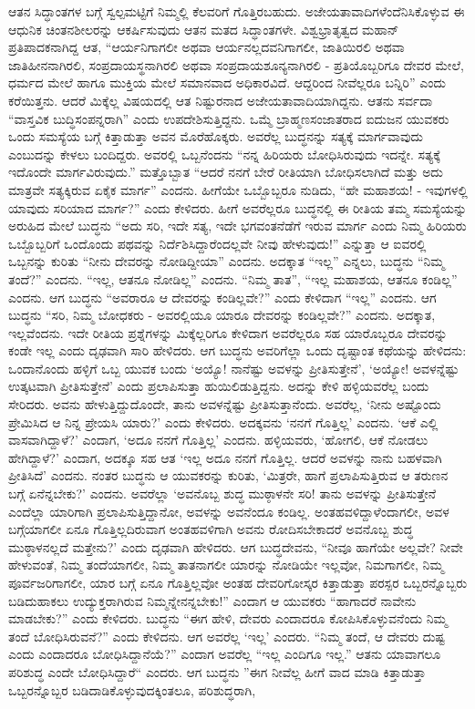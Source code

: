 ಆತನ ಸಿದ್ಧಾಂತಗಳ ಬಗ್ಗೆ ಸ್ವಲ್ಪಮಟ್ಟಿಗೆ ನಿಮ್ಮಲ್ಲಿ ಕೆಲವರಿಗೆ ಗೊತ್ತಿರಬಹುದು. ಅಜೇಯತಾವಾದಿಗಳೆಂದೆನಿಸಿಕೊಳ್ಳುವ ಈ ಆಧುನಿಕ ಚಿಂತನಶೀಲರನ್ನು ಆಕರ್ಷಿಸುವುದು ಆತನ ಮತದ ಸಿದ್ಧಾಂತಗಳೇ. ವಿಶ್ವಭ್ರಾತೃತ್ವದ ಮಹಾನ್ ಪ್ರತಿಪಾದಕನಾಗಿದ್ದ ಆತ, “ಆರ್ಯನಿಗಾಗಲೀ ಅಥವಾ ಆರ್ಯನಲ್ಲದವನಿಗಾಗಲೀ, ಜಾತಿಯಿರಲಿ ಅಥವಾ ಜಾತಿಹೀನನಾಗಿರಲಿ, ಸಂಪ್ರದಾಯಸ್ಥನಾಗಿರಲಿ ಅಥವಾ ಸಂಪ್ರದಾಯಶೂನ್ಯನಾಗಿರಲಿ - ಪ್ರತಿಯೊಬ್ಬರಿಗೂ ದೇವರ ಮೇಲೆ, ಧರ್ಮದ ಮೇಲೆ ಹಾಗೂ ಮುಕ್ತಿಯ ಮೇಲೆ ಸಮಾನವಾದ ಅಧಿಕಾರವಿದೆ. ಆದ್ದರಿಂದ ನೀವೆಲ್ಲರೂ ಬನ್ನಿರಿ” ಎಂದು ಕರೆಯಿತ್ತನು. ಆದರೆ ಮಿಕ್ಕೆಲ್ಲ ವಿಷಯದಲ್ಲಿ ಆತ ನಿಷ್ಟುರನಾದ ಅಜೇಯತಾವಾದಿಯಾಗಿದ್ದನು. ಆತನು ಸರ್ವದಾ “ವಾಸ್ತವಿಕ ಬುದ್ಧಿಸಂಪನ್ನರಾಗಿ” ಎಂದು ಉಪದೇಶಿಸುತ್ತಿದ್ದನು. ಒಮ್ಮೆ ಬ್ರಾಹ್ಮಣಸಂಜಾತರಾದ ಐದುಜನ ಯುವಕರು ಒಂದು ಸಮಸ್ಯೆಯ ಬಗ್ಗೆ ಕಿತ್ತಾಡುತ್ತಾ ಅವನ ಮೊರೆಹೊಕ್ಕರು. ಅವರೆಲ್ಲ ಬುದ್ಧನನ್ನು ಸತ್ಯಕ್ಕೆ ಮಾರ್ಗವಾವುದು ಎಂಬುದನ್ನು ಕೇಳಲು ಬಂದಿದ್ದರು. ಅವರಲ್ಲಿ ಒಬ್ಬನೆಂದನು “ನನ್ನ ಹಿರಿಯರು ಬೋಧಿಸಿರುವುದು ಇದನ್ನೇ. ಸತ್ಯಕ್ಕೆ ಇದೊಂದೇ ಮಾರ್ಗವಿರುವುದು.” ಮತ್ತೊಬ್ಬಾತ “ಆದರೆ ನನಗೆ ಬೇರೆ ರೀತಿಯಾಗಿ ಬೋಧಿಸಲಾಗಿದೆ ಮತ್ತು ಅದು ಮಾತ್ರವೇ ಸತ್ಯಕ್ಕಿರುವ ಏಕೈಕ ಮಾರ್ಗ” ಎಂದನು. ಹೀಗೆಯೇ ಒಬ್ಬೊಬ್ಬರೂ ನುಡಿದು, “ಹೇ ಮಹಾಶಯ! - ಇವುಗಳಲ್ಲಿ ಯಾವುದು ಸರಿಯಾದ ಮಾರ್ಗ?” ಎಂದು ಕೇಳಿದರು. ಹೀಗೆ ಅವರೆಲ್ಲರೂ ಬುದ್ಧನಲ್ಲಿ ಈ ರೀತಿಯ ತಮ್ಮ ಸಮಸ್ಯೆಯನ್ನು ಅರುಹಿದ ಮೇಲೆ ಬುದ್ಧನು “ಅದು ಸರಿ, ಇದೇ ಸತ್ಯ, ಇದೇ ಭಗವಂತನೆಡೆಗೆ ಇರುವ ಮಾರ್ಗ ಎಂದು ನಿಮ್ಮ ಹಿರಿಯರು ಒಬ್ಬೊಬ್ಬರಿಗೆ ಒಂದೊಂದು ಪಥವನ್ನು ನಿರ್ದೆಶಿಸಿದ್ದಾರೆಂದಲ್ಲವೇ ನೀವು ಹೇಳುವುದು!” ಎನ್ನುತ್ತಾ ಆ ಐವರಲ್ಲಿ ಒಬ್ಬನನ್ನು ಕುರಿತು “ನೀನು ದೇವರನ್ನು ನೋಡಿದ್ದೀಯಾ” ಎಂದನು. ಅದಕ್ಕಾತ “ಇಲ್ಲ” ಎನ್ನಲು, ಬುದ್ಧನು “ನಿಮ್ಮ ತಂದೆ?” ಎಂದನು. “ಇಲ್ಲ, ಆತನೂ ನೋಡಿಲ್ಲ” ಎಂದನು. “ನಿಮ್ಮ ತಾತ”, “ಇಲ್ಲ ಮಹಾಶಯ, ಆತನೂ ಕಂಡಿಲ್ಲ” ಎಂದನು. ಆಗ ಬುದ್ಧನು “ಅವರಾರೂ ಆ ದೇವರನ್ನು ಕಂಡಿಲ್ಲವೇ?” ಎಂದು ಕೇಳಿದಾಗ “ಇಲ್ಲ” ಎಂದನು. ಆಗ ಬುದ್ಧನು “ಸರಿ, ನಿಮ್ಮ ಬೋಧಕರು - ಅವರಲ್ಲಿಯೂ ಯಾರೂ ದೇವರನ್ನು ಕಂಡಿಲ್ಲವೇ?” ಎಂದನು. ಅದಕ್ಕಾತ, ಇಲ್ಲವೆಂದನು. ಇದೇ ರೀತಿಯ ಪ್ರಶ್ನೆಗಳನ್ನು ಮಿಕ್ಕೆಲ್ಲರಿಗೂ ಕೇಳಿದಾಗ ಅವರೆಲ್ಲರೂ ಸಹ ಯಾರೊಬ್ಬರೂ ದೇವರನ್ನು ಕಂಡೇ ಇಲ್ಲ ಎಂದು ದೃಢವಾಗಿ ಸಾರಿ ಹೇಳಿದರು. ಆಗ ಬುದ್ಧನು ಅವರಿಗೆಲ್ಲಾ ಒಂದು ದೃಷ್ಟಾಂತ ಕಥೆಯನ್ನು ಹೇಳಿದನು: ಒಂದಾನೊಂದು ಹಳ್ಳಿಗೆ ಒಬ್ಬ ಯುವಕ ಬಂದು ‘ಅಯ್ಯೊ! ನಾನೆಷ್ಟು ಅವಳನ್ನು ಪ್ರೀತಿಸುತ್ತೇನೆ’, ‘ಅಯ್ಯೋ! ಅವಳನ್ನೆಷ್ಟು ಉತ್ಕಟವಾಗಿ ಪ್ರೀತಿಸುತ್ತೇನೆ’ ಎಂದು ಪ್ರಲಾಪಿಸುತ್ತಾ ಹುಯಿಲಿಡುತ್ತಿದ್ದನು. ಅದನ್ನು ಕೇಳಿ ಹಳ್ಳಿಯವರೆಲ್ಲ ಬಂದು ಸೇರಿದರು. ಅವನು ಹೇಳುತ್ತಿದ್ದುದೊಂದೇ, ತಾನು ಅವಳನ್ನೆಷ್ಟು ಪ್ರೀತಿಸುತ್ತಾನೆಂದು. ಅವರೆಲ್ಲ, ‘ನೀನು ಅಷ್ಟೊಂದು ಪ್ರೇಮಿಸಿದ ಆ ನಿನ್ನ ಪ್ರೇಯಸಿ ಯಾರು?’ ಎಂದು ಕೇಳಿದರು. ಅದಕ್ಕವನು ‘ನನಗೆ ಗೊತ್ತಿಲ್ಲ’ ಎಂದನು. ‘ಆಕೆ ಎಲ್ಲಿ ವಾಸವಾಗಿದ್ದಾಳೆ?’ ಎಂದಾಗ, ‘ಅದೂ ನನಗೆ ಗೊತ್ತಿಲ್ಲ’ ಎಂದನು. ಹಳ್ಳಿಯವರು, ‘ಹೋಗಲಿ, ಆಕೆ ನೋಡಲು ಹೇಗಿದ್ದಾಳೆ?’ ಎಂದಾಗ, ಅದಕ್ಕೂ ಸಹ ಆತ ‘ಇಲ್ಲ ಅದೂ ನನಗೆ ಗೊತ್ತಿಲ್ಲ. ಆದರೆ ಅವಳನ್ನು ನಾನು ಬಹಳವಾಗಿ ಪ್ರೀತಿಸಿದೆ’ ಎಂದನು. ನಂತರ ಬುದ್ಧನು ಆ ಯುವಕರನ್ನು ಕುರಿತು, ‘ಮಿತ್ರರೇ, ಹಾಗೆ ಪ್ರಲಾಪಿಸುತ್ತಿರುವ ಆ ತರುಣನ ಬಗ್ಗೆ ಏನೆನ್ನಬೇಕು?’ ಎಂದನು. ಅವರೆಲ್ಲಾ ‘ಅವನೊಬ್ಬ ಶುದ್ಧ ಮುಠ್ಠಾಳನೇ ಸರಿ! ತಾನು ಅವಳನ್ನು ಪ್ರೀತಿಸುತ್ತೇನೆ ಎಂದೆಲ್ಲಾ ಯಾರಿಗಾಗಿ ಪ್ರಲಾಪಿಸುತ್ತಿದ್ದಾನೋ, ಅವಳನ್ನು ಅವನೆಂದೂ ಕಂಡಿಲ್ಲ. ಅಂತಹವಳಿದ್ದಾಳೆಂದಾಗಲೀ, ಅವಳ ಬಗ್ಗೆಯಾಗಲೀ ಏನೂ ಗೊತ್ತಿಲ್ಲದಿರುವಾಗ ಅಂತಹವಳಿಗಾಗಿ ಅವನು ರೋದಿಸಬೇಕಾದರೆ ಅವನೊಬ್ಬ ಶುದ್ಧ ಮುಠ್ಠಾಳನಲ್ಲದೆ ಮತ್ತೇನು?’ ಎಂದು ದೃಢವಾಗಿ ಹೇಳಿದರು. ಆಗ ಬುದ್ಧದೇವನು, “ನೀವೂ ಹಾಗೆಯೇ ಅಲ್ಲವೇ? ನೀವೇ ಹೇಳುವಂತೆ, ನಿಮ್ಮ ತಂದೆಯಾಗಲೀ, ನಿಮ್ಮ ತಾತನಾಗಲೀ ಯಾರನ್ನು ನೋಡಿಯೇ ಇಲ್ಲವೋ, ನಿಮಗಾಗಲೀ, ನಿಮ್ಮ ಪೂರ್ವಜರಿಗಾಗಲೀ, ಯಾರ ಬಗ್ಗೆ ಏನೂ ಗೊತ್ತಿಲ್ಲವೋ ಅಂತಹ ದೇವರಿಗೋಸ್ಕರ ಕಿತ್ತಾಡುತ್ತಾ ಪರಸ್ಪರ ಒಬ್ಬರನ್ನೊಬ್ಬರು ಬಡಿದುಹಾಕಲು ಉದ್ಯುಕ್ತರಾಗಿರುವ ನಿಮ್ಮನ್ನೇನನ್ನಬೇಕು!” ಎಂದಾಗ ಆ ಯುವಕರು “ಹಾಗಾದರೆ ನಾವೇನು ಮಾಡಬೇಕು?” ಎಂದು ಕೇಳಿದರು. ಬುದ್ಧನು “ಈಗ ಹೇಳಿ, ದೇವರು ಎಂದಾದರೂ ಕೋಪಿಸಿಕೊಳ್ಳುವನೆಂದು ನಿಮ್ಮ ತಂದೆ ಬೋಧಿಸಿರುವನೆ?” ಎಂದು ಕೇಳಿದನು. ಆಗ ಅವರೆಲ್ಲ ‘ಇಲ್ಲ’ ಎಂದರು. “ನಿಮ್ಮ ತಂದೆ, ಆ ದೇವರು ದುಷ್ಟ ಎಂದು ಎಂದಾದರೂ ಬೋಧಿಸಿದ್ದಾನೆಯೆ?” ಎಂದಾಗ ಅವರೆಲ್ಲ “ಇಲ್ಲ ಎಂದಿಗೂ ಇಲ್ಲ.” ಆತನು ಯಾವಾಗಲೂ ಪರಿಶುದ್ಧ ಎಂದೇ ಬೋಧಿಸಿದ್ದಾರೆ“ ಎಂದರು. ಆಗ ಬುದ್ಧನು ”ಈಗ ನೀವೆಲ್ಲ ಹೀಗೆ ವಾದ ಮಾಡಿ ಕಿತ್ತಾಡುತ್ತಾ ಒಬ್ಬರನ್ನೊಬ್ಬರ ಬಡಿದಾಡಿಕೊಳ್ಳುವುದಕ್ಕಿಂತಲೂ, ಪರಿಶುದ್ಧರಾಗಿ, 